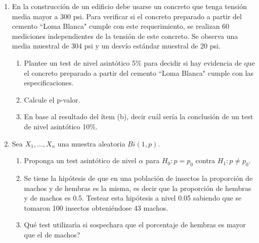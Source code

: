 \documentclass[11pt,a4paper,twoside]{article}%
\begin{document}
\begin{enumerate}


\item En la construcci\'on de un edificio debe usarse un concreto que tenga tensi\'on media mayor a 300 psi. Para verificar si el concreto preparado a partir del cemento ``Loma Blanca" cumple con este requerimiento, se realizan 60 mediciones independientes de la tensi\'on de este concreto. Se observa una media muestral de 304 psi y un desv\'io est\'andar muestral de 20 psi.
\begin{enumerate}
\item Plantee un test de nivel asint\'otico 5\% para decidir si hay evidencia de que el concreto preparado a partir del cemento ``Loma Blanca" cumple con las especificaciones.
\item Calcule el p-valor.
\item En base al resultado del \'item (b), decir cu\'al ser\'ia la conclusi\'on de un test de nivel asint\'otico 10\%.
\end{enumerate}

\item Sea $X_{1},\ldots,X_{n}$ una muestra aleatoria $Bi(1,p)$.

\begin{enumerate}
	\item Proponga un test asint\'{o}tico de nivel $\alpha$ para $H_{0}:p=p_{0}$
	contra $H_{1}:p\neq p_{0}$.
	
	\item Se tiene la hip\'{o}tesis de que en una poblaci\'{o}n de insectos la
	proporci\'{o}n de machos y de hembras es la misma, es decir que la
	proporci\'{o}n de hembras y de machos es 0.5. Testear esta hip\'{o}tesis a
	nivel 0.05 sabiendo que se tomaron 100 insectos obteni\'{e}ndose 43 machos.
	
	\item \textquestiondown Qu\'{e} test utilizar\'{\i}a si sospechara que el
	porcentaje de hembras es mayor que el de machos?
\end{enumerate}




\end{enumerate}
\end{document}
